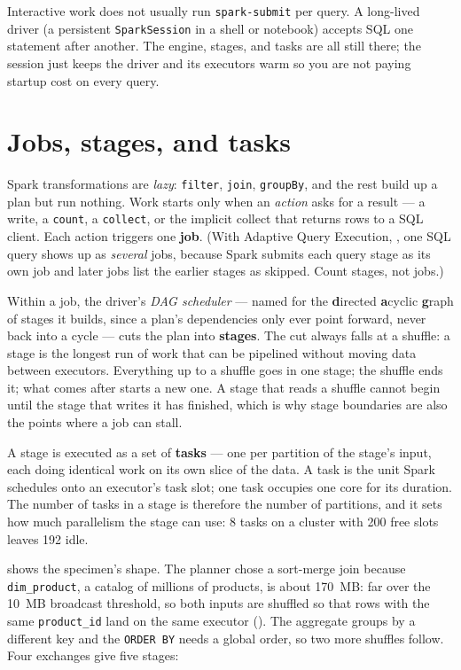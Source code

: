 Interactive work does not usually run \texttt{spark-submit} per query. A
long-lived driver (a persistent \texttt{SparkSession} in a shell or notebook)
accepts SQL one statement after another. The engine, stages, and tasks are all
still there; the session just keeps the driver and its executors warm so you are
not paying startup cost on every query.

\section{Jobs, stages, and tasks}
\label{sec:shape-jobs}

Spark transformations are \emph{lazy}: \texttt{filter}, \texttt{join},
\texttt{groupBy}, and the rest build up a plan but run nothing. Work starts only
when an \emph{action} asks for a result --- a write, a \texttt{count}, a
\texttt{collect}, or the implicit collect that returns rows to a SQL client. Each
action triggers one \textbf{job}. (With Adaptive Query Execution, , one SQL
query shows up as \emph{several} jobs, because Spark submits each query stage
as its own job and later jobs list the earlier stages as skipped. Count stages,
not jobs.)

Within a job, the driver's \emph{DAG scheduler} --- named for the
\textbf{d}irected \textbf{a}cyclic \textbf{g}raph of stages it builds, since a
plan's dependencies only ever point forward, never back into a cycle --- cuts
the plan into
\textbf{stages}. The cut always falls at a shuffle: a stage is the longest run of
work that can be pipelined without moving data between executors. Everything up to
a shuffle goes in one stage; the shuffle ends it; what comes after starts a new
one. A stage that reads a shuffle cannot begin until the stage that writes it has
finished, which is why stage boundaries are also the points where a job can
stall.

A stage is executed as a set of \textbf{tasks} --- one per partition of the
stage's input, each doing identical work on its own slice of the data. A task is
the unit Spark schedules onto an executor's task slot; one task occupies one core
for its duration. The number of tasks in a stage is therefore the number of
partitions, and it sets how much parallelism the stage can use: 8 tasks on a
cluster with 200 free slots leaves 192 idle.

 shows the specimen's shape. The planner chose a
sort-merge join because \texttt{dim\_product}, a catalog of millions of products,
is about 170~MB: far over the 10~MB broadcast threshold, so both inputs are
shuffled so that rows with the same \texttt{product\_id} land on the same
executor (). The aggregate groups by a different key and the
\texttt{ORDER BY} needs a global order, so two more shuffles follow. Four
exchanges give five stages:

